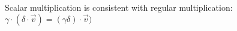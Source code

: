 \documentclass[preview]{standalone}
\begin{document}
\begin{center}
Scalar multiplication is consistent with regular multiplication: $ \gamma \cdot  (\delta \cdot \overrightarrow{v}) = ( \gamma\delta) \cdot \overrightarrow{v}) $
\end{center}
\end{document}
